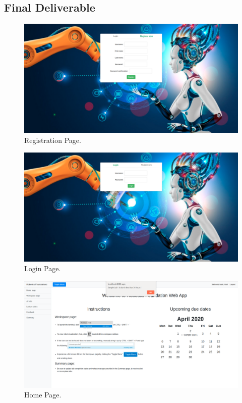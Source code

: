\documentclass{l4proj}
\begin{document}
\begin{appendices}


\chapter{Final Deliverable}

\begin{figure}[h]
    \centering
    \includegraphics[scale=0.20]{images/registration_page.png}
    \caption{Registration Page.}
\end{figure}


\begin{figure}[h]
    \centering
    \includegraphics[scale=0.20]{images/login_page.png}
    \caption{Login Page.}
\end{figure}


\begin{figure}[h]
    \centering
    \includegraphics[scale=0.20]{images/home_page.png}
    \caption{Home Page.}
\end{figure}



\end{appendices}
\end{document}
